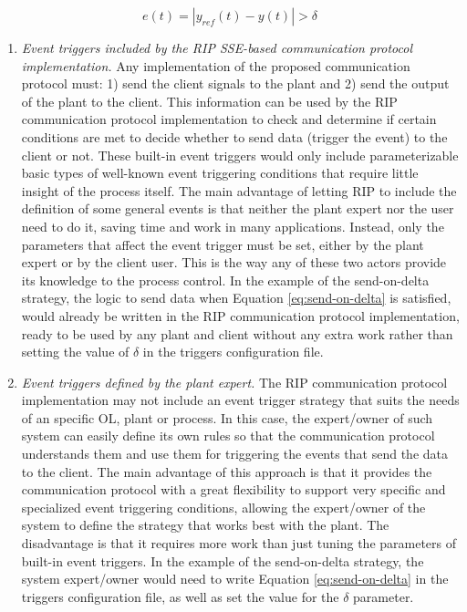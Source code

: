 \begin{equation}
e(t) = |y_{ref}(t) - y(t)| > \delta
\label{eq:send-on-delta}
\end{equation}

\begin{enumerate}
	\item \textit{Event triggers included by the RIP SSE-based communication protocol implementation.} Any implementation of the proposed communication protocol must: 1) send the client signals to the plant and 2) send the output of the plant to the client. This information can be used by the RIP communication protocol implementation to check and determine if certain conditions are met to decide whether to send data (trigger the event) to the client or not. These built-in event triggers would only include parameterizable basic types of well-known event triggering conditions that require little insight of the process itself. The main advantage of letting RIP to include the definition of some general events is that neither the plant expert nor the user need to do it, saving time and work in many applications. Instead, only the parameters that affect the event trigger must be set, either by the plant expert or by the client user. This is the way any of these two actors provide its knowledge to the process control. In the example of the send-on-delta strategy, the logic to send data when Equation \ref{eq:send-on-delta} is satisfied, would already be written in the RIP communication protocol implementation, ready to be used by any plant and client without any extra work rather than setting the value of $\delta$ in the triggers configuration file.
	\item \textit{Event triggers defined by the plant expert.} The RIP communication protocol implementation may not include an event trigger strategy that suits the needs of an specific OL, plant or process. In this case, the expert/owner of such system can easily define its own rules so that the communication protocol understands them and use them for triggering the events that send the data to the client. The main advantage of this approach is that it provides the communication protocol with a great flexibility to support very specific and specialized event triggering conditions, allowing the expert/owner of the system to define the strategy that works best with the plant. The disadvantage is that it requires more work than just tuning the parameters of built-in event triggers. In the example of the send-on-delta strategy, the system expert/owner would need to write Equation \ref{eq:send-on-delta} in the triggers configuration file, as well as set the value for the $\delta$ parameter.

\end{enumerate}
